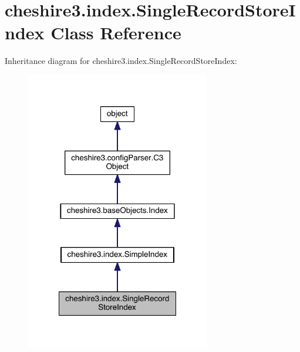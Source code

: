 \hypertarget{classcheshire3_1_1index_1_1_single_record_store_index}{\section{cheshire3.\-index.\-Single\-Record\-Store\-Index Class Reference}
\label{classcheshire3_1_1index_1_1_single_record_store_index}
}


Inheritance diagram for cheshire3.\-index.\-Single\-Record\-Store\-Index\-:
\nopagebreak
\begin{figure}[H]
\begin{center}
\leavevmode
\includegraphics[width=228pt]{classcheshire3_1_1index_1_1_single_record_store_index__inherit__graph}
\end{center}
\end{figure}


